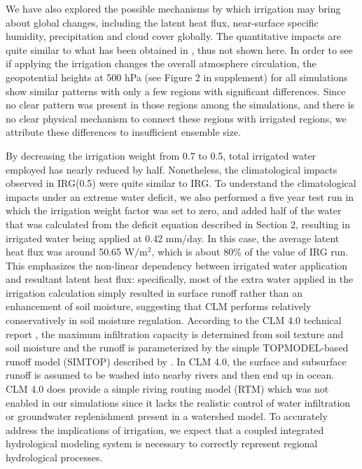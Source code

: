 \documentclass[draft,ms]{agutex}   %
\begin{document}
\begin{article}
We have also explored the possible mechanisms by which irrigation may bring about global changes, including the latent heat flux, near-surface specific humidity, precipitation and cloud cover globally. The quantitative impacts are quite similar to what has been obtained in \cite{sacks2009effects}, thus not shown here. In order to see if applying the irrigation changes the overall atmosphere circulation, the geopotential heights at 500 hPa (see Figure 2 in supplement) for all simulations show similar patterns with only a few regions with significant differences. Since no clear pattern was present in those regions among the simulations, and there is no clear physical mechanism to connect these regions with irrigated regions, we attribute these differences to insufficient ensemble size.


By decreasing the irrigation weight from 0.7 to 0.5, total irrigated water employed has nearly reduced by half. Nonetheless, the climatological impacts observed in IRG(0.5) were quite similar to IRG. To understand the climatological impacts under an extreme water deficit, we also performed a five year test run in which the irrigation weight factor was set to zero, and added half of the water that was calculated from the deficit equation described in Section 2, resulting in irrigated water being applied at 0.42 mm/day. In this case, the average latent heat flux was around 50.65 W$/$m$^2$, which is about 80$\%$ of the value of IRG run.  This emphasizes the non-linear dependency between irrigated water application and resultant latent heat flux: specifically, most of the extra water applied in the irrigation calculation simply resulted in surface runoff rather than an enhancement of soil moisture, suggesting that CLM performs relatively conservatively in soil moisture regulation. According to the CLM 4.0 technical report \citep{CLM40Tech}, the maximum infiltration capacity is determined from soil texture and soil moisture \citep{entekhabi1989land} and the runoff is parameterized by the simple TOPMODEL-based \citep{beven1979physically} runoff model (SIMTOP) described by \cite{niu2005simple}. In CLM 4.0, the surface and subsurface runoff is assumed to be washed into nearby rivers and then end up in ocean.  CLM 4.0 does provide a simple riving routing model (RTM) which was not enabled in our simulations since it lacks the realistic control of water infiltration or groundwater replenishment present in a watershed model. To accurately address the implications of irrigation, we expect that a coupled integrated hydrological modeling system is necessary to correctly represent regional hydrological processes.



\end{article}
\end{document}
